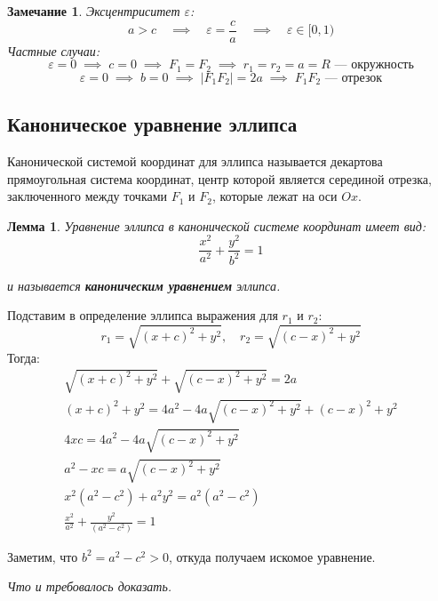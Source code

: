 \documentclass[a4paper,12pt,oneside]{extbook}
\newcommand{\newpar}{$ $\par\nobreak\ignorespaces}
\theoremstyle{numbered}
\theoremstyle{unnumbered}
\theoremstyle{named}
\theoremstyle{unnumbered}
\theoremstyle{named}
\newtheorem{lemma}{Лемма}[section]
\theoremstyle{named}
\theoremstyle{named}
\newtheorem*{note}{Замечание}
\renewenvironment{proof}[1][]{\breakenv[Доказательство]{\if\relax\detokenize{#1}\relax\else\;\fi}{\textbf{#1}}}{\smallskip\newpar \hfill\textit{Что и требовалось доказать.}}
\begin{document}
\begin{note}
    Эксцентриситет \(\varepsilon\):
    \[
        a > c \quad \implies \quad \varepsilon = \frac{c}{a} \quad \implies \quad \varepsilon \in [0, 1)
    \]
    Частные случаи:
    \[
        \varepsilon = 0 \; \implies \; c = 0 \; \implies \; F_1 = F_2 \; \implies \; r_1 = r_2 = a = R \text{ — окружность}
    \]
    \[
        \varepsilon = 0 \; \implies \; b = 0 \; \implies \; |F_1 F_2| = 2a \; \implies \; F_1 F_2 \text{ — отрезок}
    \]
\end{note}

\subsection{Каноническое уравнение эллипса}%
\label{sub:Каноническое уравнение эллипса}

\begin{siderules}
    Канонической системой координат для эллипса называется декартова прямоугольная система координат, центр которой является серединой отрезка, заключенного между точками \(F_1\) и \(F_2\), которые лежат на оси \(Ox\).
\end{siderules}

\begin{lemma}
    Уравнение эллипса в канонической системе координат имеет вид:
    \[
        \frac{x^2}{a^2} + \frac{y^2}{b^2} = 1
    \]

    и называется \textbf{каноническим уравнением} эллипса.
\end{lemma}

\begin{proof}
    Подставим в определение эллипса выражения для \(r_1\) и \(r_2\):
    \[
        r_1 = \sqrt{{(x + c)}^2 + y^2}, \quad r_2 = \sqrt{{(c - x)}^2 + y^2}
    \]
    Тогда:
    \begin{gather*}
        \sqrt{{(x + c)}^2 + y^2} + \sqrt{{(c - x)}^2 + y^2} = 2a \\
        {(x + c)}^2 + y^2 = 4a^2 - 4a \sqrt{{(c - x)}^2 + y^2} + {(c - x)}^2 + y^2 \\
        4xc = 4a^2 - 4a \sqrt{{(c - x)}^2 + y^2} \\
        a^2 - xc = a \sqrt{{(c - x)}^2 + y^2} \\
        x^2 (a^2 - c^2) + a^2 y^2 = a^2 (a^2 - c^2) \\
        \frac{x^2}{a^2} + \frac{y^2}{(a^2 - c^2)} = 1
    \end{gather*}

    Заметим, что \(b^2 = a^2 - c^2 > 0\), откуда получаем искомое уравнение.
\end{proof}
\end{document}
